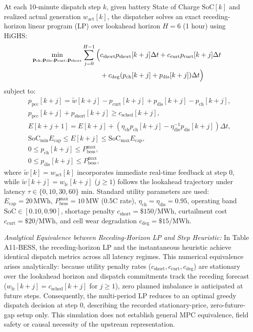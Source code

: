 \documentclass[
  journal]{IEEEtran}
\begin{document}
At each 10-minute dispatch step \(k\), given battery State of Charge
\(\mathrm{SoC}[k]\) and realized actual generation
\(w_{\mathrm{act}}[k]\), the dispatcher solves an exact receding-horizon
linear program (LP) over lookahead horizon \(H=6\) (1 hour) using HiGHS:
\begin{align}
\min_{\mathbf{p}_{\mathrm{ch}}, \mathbf{p}_{\mathrm{dis}}, \mathbf{p}_{\mathrm{curt}}, \mathbf{p}_{\mathrm{short}}} \sum_{j=0}^{H-1} \Big( &c_{\mathrm{short}} p_{\mathrm{short}}[k+j] \Delta t + c_{\mathrm{curt}} p_{\mathrm{curt}}[k+j] \Delta t \notag \\
&+ c_{\mathrm{deg}} (p_{\mathrm{ch}}[k+j] + p_{\mathrm{dis}}[k+j]) \Delta t \Big)
\end{align} subject to: \begin{align}
&p_{\mathrm{pcc}}[k+j] = \tilde{w}[k+j] - p_{\mathrm{curt}}[k+j] + p_{\mathrm{dis}}[k+j] - p_{\mathrm{ch}}[k+j], \\
&p_{\mathrm{pcc}}[k+j] + p_{\mathrm{short}}[k+j] \ge c_{\mathrm{sched}}[k+j], \\
&E[k+j+1] = E[k+j] + (\eta_{\mathrm{ch}} p_{\mathrm{ch}}[k+j] - \eta_{\mathrm{dis}}^{-1} p_{\mathrm{dis}}[k+j]) \Delta t, \\
&\mathrm{SoC}_{\min} E_{\mathrm{cap}} \le E[k+j] \le \mathrm{SoC}_{\max} E_{\mathrm{cap}}, \\
&0 \le p_{\mathrm{ch}}[k+j] \le P_{\mathrm{bess}}^{\max}, \\
&0 \le p_{\mathrm{dis}}[k+j] \le P_{\mathrm{bess}}^{\max},
\end{align} where \(\tilde{w}[k] = w_{\mathrm{act}}[k]\) incorporates
immediate real-time feedback at step 0, while
\(\tilde{w}[k+j] = w_{\mathrm{fc}}[k+j]\) (\(j \ge 1\)) follows the
lookahead trajectory under latency
\(\tau \in \{0, 10, 30, 60\}\text{ min}\). Standard utility parameters
are used: \(E_{\mathrm{cap}} = 20\,\text{MWh}\),
\(P_{\mathrm{bess}}^{\max} = 10\,\text{MW}\) (0.5C rate),
\(\eta_{\mathrm{ch}} = \eta_{\mathrm{dis}} = 0.95\), operating band
\(\mathrm{SoC} \in [0.10, 0.90]\), shortage penalty
\(c_{\mathrm{short}} = \$150/\text{MWh}\), curtailment cost
\(c_{\mathrm{curt}} = \$20/\text{MWh}\), and cell wear degradation
\(c_{\mathrm{deg}} = \$15/\text{MWh}\).

\emph{Analytical Equivalence between Receding-Horizon LP and Step
Heuristic:} In Table A11-BESS, the receding-horizon LP and the
instantaneous heuristic achieve identical dispatch metrics across all
latency regimes. This numerical equivalence arises analytically: because
utility penalty rates
(\(c_{\mathrm{short}}, c_{\mathrm{curt}}, c_{\mathrm{deg}}\)) are
stationary over the lookahead horizon and dispatch commitments track the
receding forecast (\(w_{\mathrm{fc}}[k+j] = c_{\mathrm{sched}}[k+j]\)
for \(j \ge 1\)), zero planned imbalance is anticipated at future steps.
Consequently, the multi-period LP reduces to an optimal greedy dispatch
decision at step 0, describing the recorded stationary-price,
zero-future-gap setup only. This simulation does not establish general
MPC equivalence, field safety or causal necessity of the upstream
representation.
\end{document}
